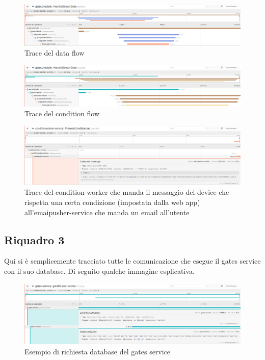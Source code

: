 \documentclass[a4paper,12pt,titlepage,italian,openany]{report}
\begin{document}
\begin{figure}[H]
    \includegraphics[scale=0.21]{76.png}
    \centering
    \caption{Trace del data flow}
\end{figure}
\begin{figure}[H]
    \includegraphics[scale=0.21]{77.png}
    \centering
    \caption{Trace del condition flow}
\end{figure}
\begin{figure}[H]
    \includegraphics[scale=0.21]{78.png}
    \centering
    \caption{Trace del condition-worker che manda il messaggio del device che rispetta una certa condizione (impostata dalla web app) all'emaipusher-service che manda un email all'utente}
\end{figure}

\subsection{Riquadro 3}
Qui si è semplicemente tracciato tutte le comunicazione che esegue il gates service con il suo database. Di seguito qualche immagine esplicativa.
\begin{figure}[H]
    \includegraphics[scale=0.21]{90.png}
    \centering
    \caption{Esempio di richiesta database del gates service}
\end{figure}
\newpage
\end{document}

